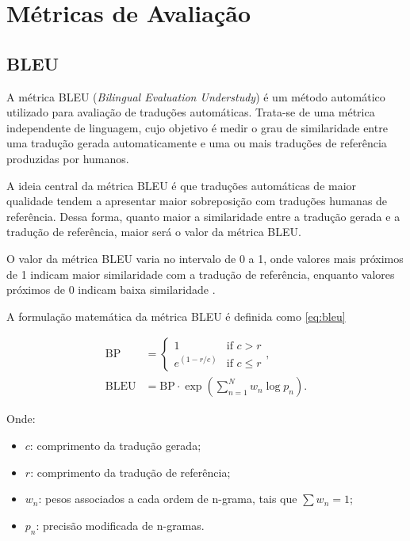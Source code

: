 \section{Métricas de Avaliação}
\subsection{BLEU}


A métrica BLEU (\textit{Bilingual Evaluation Understudy}) é um método automático utilizado para avaliação de traduções automáticas. Trata-se de uma métrica independente de linguagem, cujo objetivo é medir o grau de similaridade entre uma tradução gerada automaticamente e uma ou mais traduções de referência produzidas por humanos.

A ideia central da métrica BLEU é que traduções automáticas de maior qualidade tendem a apresentar maior sobreposição com traduções humanas de referência. Dessa forma, quanto maior a similaridade entre a tradução gerada e a tradução de referência, maior será o valor da métrica BLEU.

O valor da métrica BLEU varia no intervalo de 0 a 1, onde valores mais próximos de 1 indicam maior similaridade com a tradução de referência, enquanto valores próximos de 0 indicam baixa similaridade \cite{papineni2002bleu}.

A formulação matemática da métrica BLEU é definida como \ref{eq:bleu}

\begin{equation} \label{eq:bleu}
\begin{aligned}
    \text{BP}   & =
    \begin{cases}
        1           & \text{if } c > r    \\
        e^{(1-r/c)} & \text{if } c \leq r
    \end{cases},  \\[6pt]
    \text{BLEU} & = \text{BP} \cdot \exp \left( \sum_{n=1}^{N} w_n \log p_n \right) .
\end{aligned}
\end{equation}

Onde:

\begin{itemize}
    \item \(c\): comprimento da tradução gerada;
    \item \(r\): comprimento da tradução de referência;
    \item \(w_n\): pesos associados a cada ordem de n-grama, tais que \( \sum w_n = 1 \);
    \item \(p_n\): precisão modificada de n-gramas.
\end{itemize}

